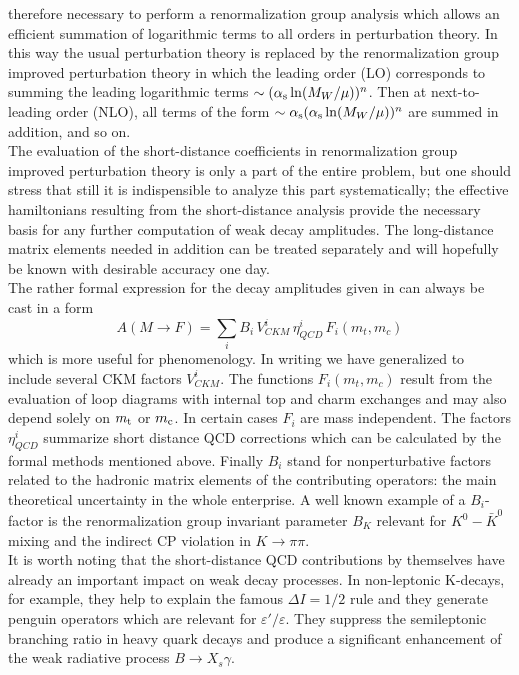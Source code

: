 therefore necessary to perform a renormalization group analysis which
allows an efficient summation of logarithmic terms to all orders in
perturbation theory. In this way the usual perturbation theory is
replaced by the renormalization group improved perturbation theory in
which the leading order (LO) corresponds to summing the leading
logarithmic terms $\sim (\alpha_{\rm s} \ln(M_W/\mu))^n$. Then at next-to-leading
order (NLO), all terms of the form $\sim\alpha_{\rm s} (\alpha_{\rm s} \ln(M_W/\mu))^n$ are
summed in addition, and so on.
\\
The evaluation of the short-distance coefficients in
renormalization group improved perturbation theory is only a part of
the entire problem, but one should stress that still it is
indispensible to analyze this part systematically; the effective
hamiltonians resulting from the short-distance analysis provide the
necessary basis for any further computation of weak decay amplitudes.
The long-distance matrix elements needed in addition
can be treated separately and will hopefully be known with
desirable accuracy one day.
\\
The rather formal expression for the decay amplitudes given in
 can always be cast in a form \cite{buchallaetal:91}
\begin{equation}
A(M \to F)=\sum_i B_i \, V_{CKM}^{i} \, \eta^{i}_{QCD} \, F_i(m_t,m_c)
\label{PBEE}
\end{equation}
which is more useful for phenomenology.  In writing  we
have generalized  to include several CKM factors
$V_{CKM}^{i}$. The functions $F_i(m_t,m_c)$ result from the evaluation of
loop diagrams with internal top and charm exchanges  and may also depend
solely on $m_{\rm t}$ or $m_{\rm c}$. In certain cases $F_i$ are mass independent.
The factors $\eta^{i}_{QCD}$ summarize short distance QCD corrections
which can be calculated by the formal methods mentioned above. Finally
$B_i$ stand for nonperturbative factors related to the hadronic matrix
elements of the contributing operators: the main theoretical
uncertainty in the whole enterprise. A well known example of a
$B_i$-factor is the renormalization group invariant parameter $B_K$
relevant for $K^0-\bar K^0$ mixing and the indirect CP violation in
$K \to \pi\pi$.
\\
It is worth noting that the short-distance QCD contributions by
themselves have already an important impact on weak decay processes. In
non-leptonic K-decays, for example, they help to explain the famous
$\Delta I=1/2$ rule and they generate penguin operators which are
relevant for $\varepsilon' /\varepsilon$. They suppress the
semileptonic branching ratio in heavy quark decays and produce a
significant enhancement of the weak radiative process $B\to X_s\gamma$.

